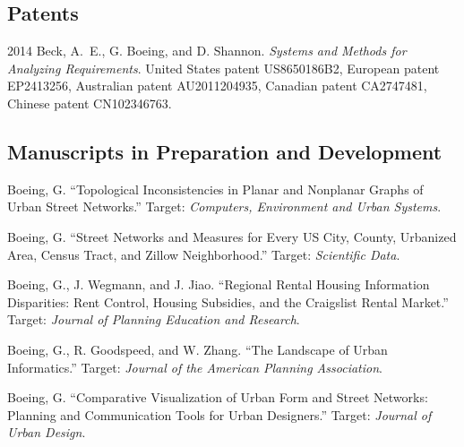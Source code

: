 \documentclass{academiccv}
\begin{document}
\subsection*{Patents}

\begin{tablist}

\item[2014] \tab Beck, A.~E., G. Boeing, and D. Shannon. \textit{Systems and Methods for Analyzing Requirements}. United States patent US8650186B2, European patent EP2413256, Australian patent AU2011204935, Canadian patent CA2747481, Chinese patent CN102346763.

\end{tablist}



\subsection*{Manuscripts in Preparation and Development}

\begin{tablist}

\item[\the\year] \tab Boeing, G. \enquote{Topological Inconsistencies in Planar and Nonplanar Graphs of Urban Street Networks.} Target: \textit{Computers, Environment and Urban Systems}.

\item[\the\year] \tab Boeing, G. \enquote{Street Networks and Measures for Every US City, County, Urbanized Area, Census Tract, and Zillow Neighborhood.} Target: \textit{Scientific Data}.

\item[\the\year] \tab Boeing, G., J. Wegmann, and J. Jiao. \enquote{Regional Rental Housing Information Disparities: Rent Control, Housing Subsidies, and the Craigslist Rental Market.} Target: \textit{Journal of Planning Education and Research}.

\item[\the\year] \tab Boeing, G., R. Goodspeed, and W. Zhang. \enquote{The Landscape of Urban Informatics.} Target: \textit{Journal of the American Planning Association}.

\item[\the\year] \tab Boeing, G. \enquote{Comparative Visualization of Urban Form and Street Networks: Planning and Communication Tools for Urban Designers.} Target: \textit{Journal of Urban Design}.
	
\end{tablist}
\end{document}
